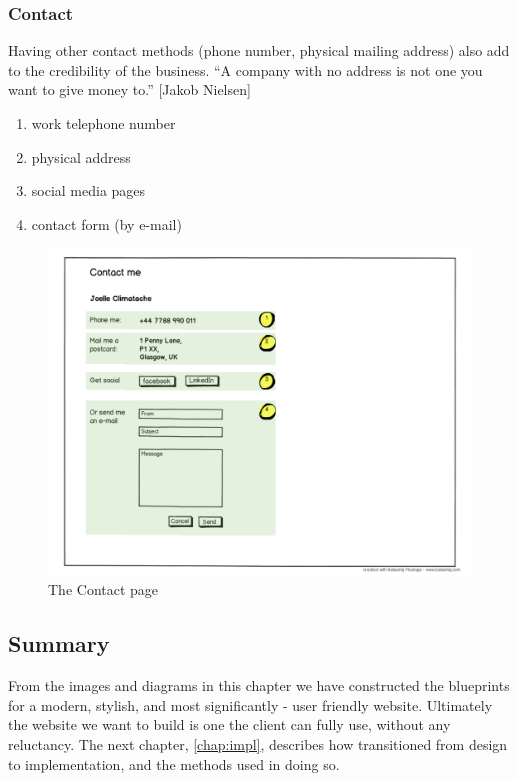 \documentclass{l3proj}
\begin{document}
\subsubsection{Contact}
Having other contact methods (phone number, physical mailing address) also add
to the credibility of the business. ``A company with no address is not one you
want to give money to.'' [Jakob Nielsen]
\begin{enumerate} \itemsep1pt \parskip0pt 
	\item work telephone number
	\item physical address
	\item social media pages
	\item contact form (by e-mail)
\end{enumerate}

\begin{figure}
\label{wireframes:contact}
\begin{center}
\includegraphics[width=\linewidth, trim = 0px 40px 0px 220px]
	{wireframes/contact}
\caption{The Contact page}
\end{center}
\end{figure}

\subsection{Summary}
From the images and diagrams in this chapter we have constructed the blueprints for a modern, stylish, and most significantly - user friendly website. Ultimately the website we want to build is one the client can fully use, without any reluctancy. The next chapter, \ref{chap:impl}, describes how transitioned from design to implementation, and the methods used in doing so.
\end{document}
